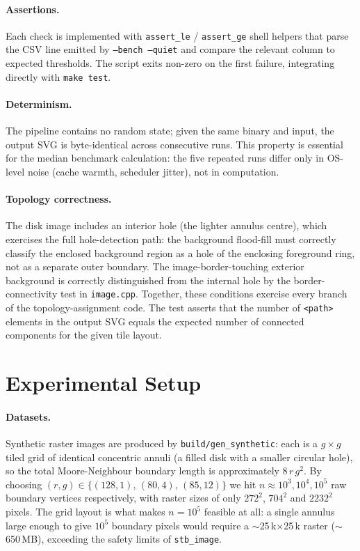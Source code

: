 \documentclass[twocolumn,a4paper,10pt]{article}
\begin{document}
\paragraph*{Assertions.}
Each check is implemented with \texttt{assert\_le} / \texttt{assert\_ge}
shell helpers that parse the CSV line emitted by \texttt{--bench
--quiet} and compare the relevant column to expected thresholds.  The
script exits non-zero on the first failure, integrating directly with
\texttt{make test}.

\paragraph*{Determinism.}  The pipeline contains no random state;
given the same binary and input, the output SVG is byte-identical
across consecutive runs.  This property is essential for the median
benchmark calculation: the five repeated runs differ only in OS-level
noise (cache warmth, scheduler jitter), not in computation.

\paragraph*{Topology correctness.}
The disk image includes an interior hole (the lighter annulus centre),
which exercises the full hole-detection path: the background flood-fill
must correctly classify the enclosed background region as a hole of the
enclosing foreground ring, not as a separate outer boundary.  The
image-border-touching exterior background is correctly distinguished
from the internal hole by the border-connectivity test in
\texttt{image.cpp}.  Together, these conditions exercise every branch of
the topology-assignment code.  The test asserts that the number of
\texttt{<path>} elements in the output SVG equals the expected
number of connected components for the given tile layout.

\section{Experimental Setup}
\label{sec:experiments}

\paragraph*{Datasets.}  Synthetic raster images are produced by
\texttt{build/gen\_synthetic}: each is a $g\!\times\!g$ tiled grid of
identical concentric annuli (a filled disk with a smaller circular
hole), so the total Moore-Neighbour boundary length is approximately
$8\,r\,g^2$.  By choosing $(r,g) \in \{(128,1),\,(80,4),\,(85,12)\}$
we hit $n \approx 10^3, 10^4, 10^5$ raw boundary vertices respectively,
with raster sizes of only $272^2$, $704^2$ and $2232^2$ pixels.  The
grid layout is what makes $n=10^5$ feasible at all: a single annulus
large enough to give $10^5$ boundary pixels would require a
$\sim$25\,k$\times$25\,k raster ($\sim$650\,MB), exceeding the safety
limits of \texttt{stb\_image}.
\end{document}
